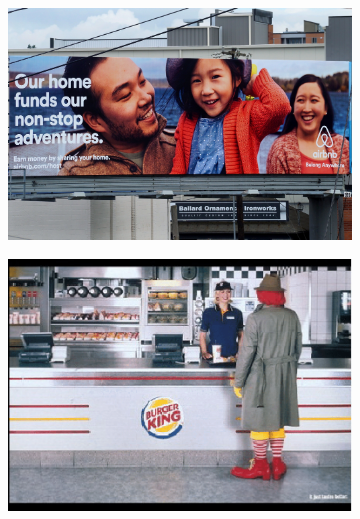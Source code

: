 \begin{figure}
    \centering
    \begin{subfigure}[b]{0.4\textwidth}
         \centering
         \includegraphics[width=\textwidth,scale=0.6]{images/airbnb.jpeg}
         \caption{}
         \label{fig:Airbib}
     \end{subfigure}
     \begin{subfigure}[b]{0.4\textwidth}
         \centering
         \includegraphics[width=\textwidth,scale=0.5]{images/Burger-King-vs-McDonalds-comparative-ad.png}
         \label{fig:mcdonald}
     \end{subfigure}
     \begin{subfigure}[b]{0.3\textwidth}
         \centering

\end{subfigure}
\end{figure}
